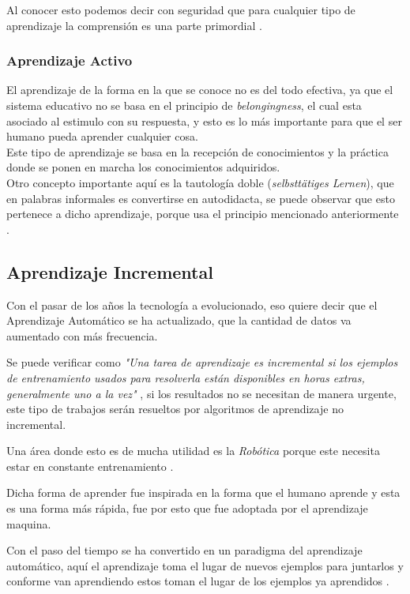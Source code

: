             Al conocer esto podemos decir con seguridad que para cualquier tipo de aprendizaje la comprensi\'on es 
            una parte primordial \cite{perez2014}.

        \subsubsection{Aprendizaje Activo}
            El aprendizaje de la forma en la que se conoce no es del todo efectiva, ya que el sistema educativo
            no se basa en el principio de \textit{belongingness}, el cual esta asociado al estimulo con su respuesta,
            y esto es lo m\'as importante para que el ser humano pueda aprender cualquier cosa.\\
            Este tipo de aprendizaje se basa en la recepci\'on de conocimientos y la pr\'actica donde se ponen en marcha los conocimientos adquiridos.\\
            Otro concepto importante aqu\'i es la tautolog\'ia doble (\textit{selbstt\"atiges Lernen}), que en palabras informales es convertirse en autodidacta, 
            se puede observar que esto pertenece a dicho aprendizaje, porque usa el principio mencionado anteriormente \cite{Huber2008}.
   

 \subsection{Aprendizaje Incremental}
        Con el pasar de los años la tecnología a evolucionado, eso quiere decir que el Aprendizaje Automático se ha actualizado, que la 
        cantidad de datos va aumentado con más frecuencia.
        
        Se puede verificar como \textit{"Una tarea de aprendizaje es incremental si los ejemplos de entrenamiento usados para 
        resolverla están disponibles en horas extras, generalmente uno a la vez"} \cite{GiraudCarrier2000}, si los resultados no se 
        necesitan de manera urgente, este tipo de trabajos serán resueltos por algoritmos de aprendizaje no incremental. 

        Una área donde esto es de mucha utilidad es la \textit{Rob\'otica} porque este necesita estar en constante entrenamiento \cite{GiraudCarrier2000}.

        Dicha forma de aprender fue inspirada en la forma que el humano aprende y esta es una forma más rápida, fue por esto que fue adoptada 
        por el aprendizaje maquina.

        Con el paso del tiempo se ha convertido en un paradigma del aprendizaje automático, aquí el aprendizaje toma el lugar de nuevos ejemplos para juntarlos 
        y conforme van aprendiendo estos toman el lugar de los ejemplos ya aprendidos \cite{liu2015}.

